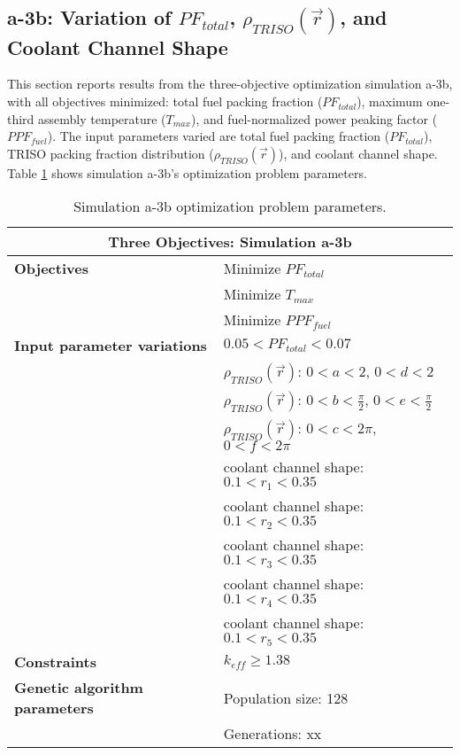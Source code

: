 \subsection{a-3b: Variation of $PF_{total}$, $\rho_{TRISO}(\vec{r})$, and Coolant 
Channel Shape}
\label{sec:a-3b}
This section reports results from the three-objective optimization simulation a-3b, 
with all objectives minimized: total fuel packing fraction ($PF_{total}$), maximum 
one-third assembly temperature ($T_{max}$), and fuel-normalized power peaking factor 
($PPF_{fuel}$).  
The input parameters varied are total fuel packing fraction ($PF_{total}$), 
TRISO packing fraction distribution ($\rho_{TRISO}(\vec{r})$), and coolant channel 
shape.  
Table \ref{tab:simulationa3b} shows simulation a-3b's optimization problem parameters. 
\begin{table}[htbp!]
    \centering
    \onehalfspacing
    \caption{Simulation a-3b optimization problem parameters.}
	\label{tab:simulationa3b}
    \footnotesize
    \begin{tabular}{l|p{6.5cm}}
    \hline 
    \multicolumn{2}{c}{\textbf{Three Objectives: Simulation a-3b}} \\
    \hline 
    \textbf{Objectives} & Minimize $PF_{total}$ \\
    & Minimize $T_{max}$ \\
    & Minimize $PPF_{fuel}$ \\
    \hline 
    \textbf{Input parameter variations} & $0.05<PF_{total}<0.07$ \\
    & $\rho_{TRISO}(\vec{r})$: $0<a<2$, $0<d<2$\\
    & $\rho_{TRISO}(\vec{r})$: $0<b<\frac{\pi}{2}$, $0<e<\frac{\pi}{2}$\\
    & $\rho_{TRISO}(\vec{r})$: $0<c<2\pi$, $0<f<2\pi$\\
    & coolant channel shape: $0.1<r_{1}<0.35$ \\
    & coolant channel shape: $0.1<r_{2}<0.35$ \\
    & coolant channel shape: $0.1<r_{3}<0.35$ \\
    & coolant channel shape: $0.1<r_{4}<0.35$ \\
    & coolant channel shape: $0.1<r_{5}<0.35$ \\
    \hline
    \textbf{Constraints} & $k_{eff} \geq 1.38$\\ 
    \hline 
    \textbf{Genetic algorithm parameters} & Population size: 128 \\
    & Generations: xx \\
    \hline
    \end{tabular}
\end{table}

